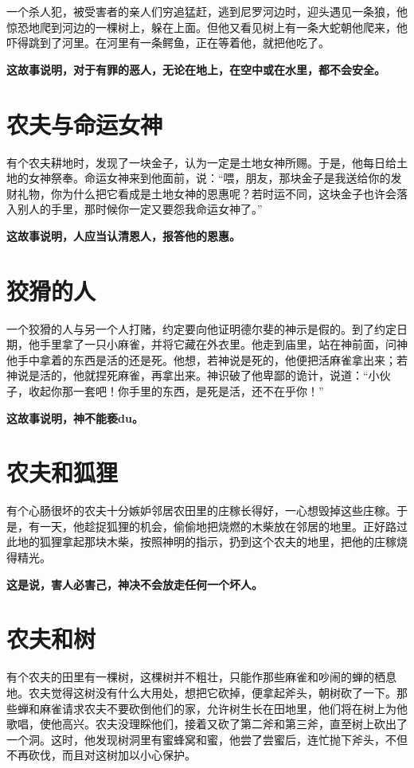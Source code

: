 一个杀人犯，被受害者的亲人们穷追猛赶，逃到尼罗河边时，迎头遇见一条狼，他惊恐地爬到河边的一棵树上，躲在上面。但他又看见树上有一条大蛇朝他爬来，他吓得跳到了河里。在河里有一条鳄鱼，正在等着他，就把他吃了。

{\bfseries \color{red}这故事说明，对于有罪的恶人，无论在地上，在空中或在水里，都不会安全。}

\section{农夫与命运女神}

有个农夫耕地时，发现了一块金子，认为一定是土地女神所赐。于是，他每日给土地的女神祭奉。命运女神来到他面前，说：“喂，朋友，那块金子是我送给你的发财礼物，你为什么把它看成是土地女神的恩惠呢？若时运不同，这块金子也许会落入别人的手里，那时候你一定又要怨我命运女神了。”

{\bfseries \color{red}这故事说明，人应当认清恩人，报答他的恩惠。}

\section{狡猾的人}

一个狡猾的人与另一个人打赌，约定要向他证明德尔斐的神示是假的。到了约定日期，他手里拿了一只小麻雀，并将它藏在外衣里。他走到庙里，站在神前面，问神他手中拿着的东西是活的还是死。他想，若神说是死的，他便把活麻雀拿出来；若神说是活的，他就捏死麻雀，再拿出来。神识破了他卑鄙的诡计，说道：“小伙子，收起你那一套吧！你手里的东西，是死是活，还不在乎你！”

{\bfseries \color{red}这故事说明，神不能亵du。}

\section{农夫和狐狸}

有个心肠很坏的农夫十分嫉妒邻居农田里的庄稼长得好，一心想毁掉这些庄稼。于是，有一天，他趁捉狐狸的机会，偷偷地把烧燃的木柴放在邻居的地里。正好路过此地的狐狸拿起那块木柴，按照神明的指示，扔到这个农夫的地里，把他的庄稼烧得精光。

{\bfseries \color{red}这是说，害人必害己，神决不会放走任何一个坏人。}

\section{农夫和树}

有个农夫的田里有一棵树，这棵树并不粗壮，只能作那些麻雀和吵闹的蝉的栖息地。农夫觉得这树没有什么大用处，想把它砍掉，便拿起斧头，朝树砍了一下。那些蝉和麻雀请求农夫不要砍倒他们的家，允许树生长在田地里，他们将在树上为他歌唱，使他高兴。农夫没理睬他们，接着又砍了第二斧和第三斧，直至树上砍出了一个洞。这时，他发现树洞里有蜜蜂窝和蜜，他尝了尝蜜后，连忙抛下斧头，不但不再砍伐，而且对这树加以小心保护。

